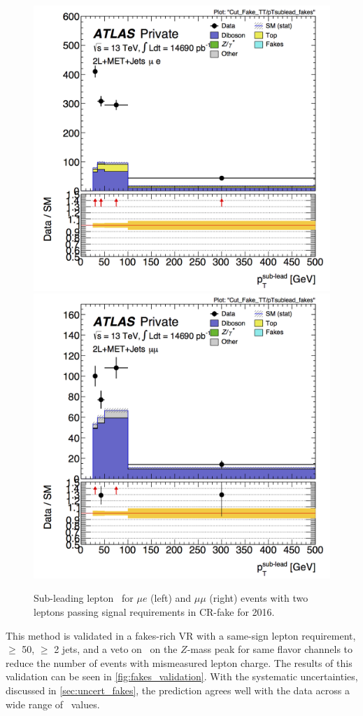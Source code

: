 \begin{centering}
\begin{figure}[htbp]
\centering
\includegraphics[width=.45\textwidth]{figures/fakes/me-Cut_Fake_TT-pTsublead_fakes-lin_2016.png}
\includegraphics[width=.45\textwidth]{figures/fakes/mm-Cut_Fake_TT-pTsublead_fakes-lin_2016.png}
\caption{Sub-leading lepton \pT\ for $\mu e$ (left) and $\mu\mu$ (right) events with two leptons passing signal requirements in CR-fake for 2016.}
\label{fig:fake_fakereg}
\end{figure}
\end{centering}

This method is validated in a fakes-rich \ac{VR} with a same-sign lepton requirement, \met $\geq$ 50\gev, $\geq$ 2 jets, and a veto on \mll~on the $Z$-mass peak for same flavor channels to reduce the number of \dyjets events with mismeasured lepton charge. The results of this validation can be seen in \autoref{fig:fakes_validation}. With the systematic uncertainties, discussed in \autoref{sec:uncert_fakes}, the prediction agrees well with the data across a wide range of \mll~values. 


